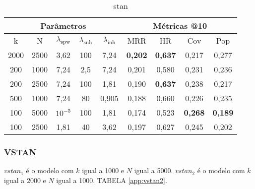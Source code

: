 \begin{table}[htbp]
    \centering
    \begin{tabular}{|c|c|c|c|c|c|c|c|c|}
      \hline
      \multicolumn{5}{|c|}{Parâmetros} & \multicolumn{4}{c|}{Métricas @10} \\
      \hline
      k & N & $\lambda_{\text{spw}}$ & $\lambda_{\text{snh}}$ & $\lambda_{\text{inh}}$ & MRR & HR & Cov & Pop \\
      \hline
      2000 & 2500 & 3,62 & 100 & 7,24 & \textbf{0,202} & \textbf{0,637} & 0,217 & 0,277 \\
      \hline
      200 & 1000 & 7,24 & 2,5 & 7,24 & 0,201 & 0,580 & 0,231 & 0,236 \\
      \hline
      200 & 2500 & 7,24 & 100 & 1,81& 0,190 & \textbf{0,637} & 0,238 & 0,217 \\
      \hline
      500 & 1000 & 7,24 & 80 & 0,905 & 0,188 & 0,660 & 0,226 & 0,235 \\
      \hline
      100 & 5000 & $10^{-5}$ & 100 & 1,81 & 0,174 & 0,523 & \textbf{0,268} & \textbf{0,189} \\
      \hline
      100 & 2500 & 1,81 & 40 & 3,62 & 0,197 & 0,627 & 0,245 & 0,202 \\
      \hline

    \end{tabular}
    \label{app:stan2}
    \caption{stan}
  \end{table}


\subsubsection{VSTAN}
$vstan_1$ é o modelo com $k$ igual a 1000 e $N$ igual a 5000. 
$vstan_2$ é o modelo com $k$ igual a 2000 e $N$ igual a 1000. 
TABELA \ref{app:vstan2}.


